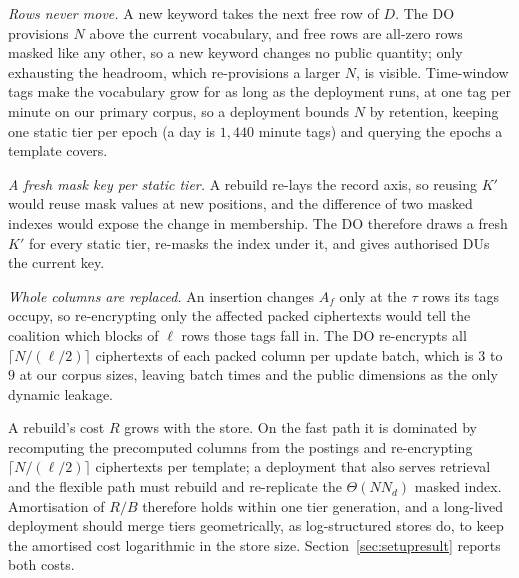 \documentclass[a4paper,fleqn]{cas-dc}
\begin{document}
\emph{Rows never move.} A new keyword takes the next free row of $D$. The DO
provisions $N$ above the current vocabulary, and free rows are all-zero rows
masked like any other, so a new keyword changes no public quantity; only
exhausting the headroom, which re-provisions a larger $N$, is visible.
Time-window tags make the vocabulary grow for as long as the deployment runs,
at one tag per minute on our primary corpus, so a deployment bounds $N$ by
retention, keeping one static tier per epoch (a day is $1{,}440$ minute tags)
and querying the epochs a template covers.

\emph{A fresh mask key per static tier.} A rebuild re-lays the record axis, so
reusing $K'$ would reuse mask values at new positions, and the difference of
two masked indexes would expose the change in membership. The DO therefore
draws a fresh $K'$ for every static tier, re-masks the index under it, and
gives authorised DUs the current key.

\emph{Whole columns are replaced.} An insertion changes $A_f$ only at the
$\tau$ rows its tags occupy, so re-encrypting only the affected packed
ciphertexts would tell the coalition which blocks of $\ell$ rows those tags
fall in. The DO re-encrypts all $\lceil N/(\ell/2)\rceil$ ciphertexts of
each packed column per update batch, which is $3$ to $9$ at our corpus sizes,
leaving batch times and the public dimensions as the only dynamic leakage.

A rebuild's cost $R$ grows with the store. On the fast path it is dominated by
recomputing the precomputed columns from the postings and re-encrypting
$\lceil N/(\ell/2)\rceil$ ciphertexts per template; a deployment that also
serves retrieval and the flexible path must rebuild and re-replicate the
$\Theta(N N_d)$ masked index. Amortisation of $R/B$ therefore holds within one tier generation, and a
long-lived deployment should merge tiers geometrically, as log-structured
stores do, to keep the amortised cost logarithmic in the store size.
Section~\ref{sec:setupresult} reports both costs.
\end{document}

